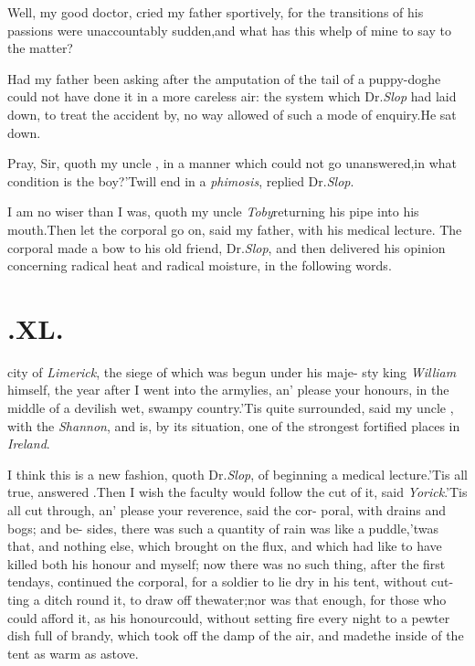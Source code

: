 \documentclass[twoside]{article}
\begin{document}
Well, my good doctor, cried my father sportively, for the
transitions of his passions were unaccountably sudden,\tsk and
what has this whelp of mine to say to the matter?\tsh

Had my father been asking after the amputation of the tail of a
puppy-dog\break\tsk he could not have done it in a more careless air:
the system which Dr.\@ \textit{Slop} had laid down, to treat the
accident by, no way allowed of such a mode of enquiry.\tsk He sat
down.

Pray, Sir, quoth my uncle \toby, in a manner which could
not go unanswered,\break\tsk in what condition is the
boy?\tsk ’Twill end in a \textit{phimosis}, replied Dr.\@ \textit{Slop}.

I am no wiser than I was, quoth my uncle
\textit{Toby}\tsk returning his pipe into his
mouth.\tsh Then let the corporal go on,
said my father,
with his medical lecture.\break
\tsk The corporal made a bow to his old
friend, Dr.\@ \textit{Slop}, and then delivered his opinion concerning
radical heat and radical moisture, in the following words.

\section{.\enspace  XL.}

 city of \textit{Limerick}, the
siege of\break
which was begun under his maje-\break
sty king \textit{William}
himself, the year after I went into the army\tsk lies, an’
please your honours, in the middle of a devilish wet, swampy
country.\tsk ’Tis quite surrounded, said my uncle
\toby, with the \textit{Shannon}, and is, by its situation, one
of the strongest fortified places in
\textit{Ireland}.\tsh

\eject
I think this is a new fashion, quoth Dr.\@ \textit{Slop}, of
beginning a medical lecture.\break\tsk ’Tis all true, answered
\trim.\tsk Then\break 
I wish the faculty would follow the cut\break
of it, said \textit{Yorick}.\tsk ’Tis all cut through,\break
an’ please your reverence, said the cor-\break
poral, with drains and bogs; and be-\break
sides, there was such a quantity of rain\break 
{} was like a puddle,\tsh ’twas that, and
nothing else, which brought on the\break
flux, and which had like to have
killed both his honour and myself; now there was no such thing,
after the first ten\break days, continued the corporal, for a soldier to
lie dry in his tent, without cut-\break ting a ditch round it, to draw off
the\break water;\tsk nor was that enough, for those who could afford
it, as his honour\break could, without setting fire every night to a
pewter dish full of brandy, which took off the damp of the air, and
made\break the inside of the tent as warm as a\break stove.\tsh
\end{document}
